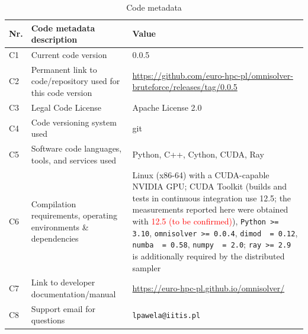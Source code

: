 \documentclass[preprint,12pt,a4paper]{elsarticle}
\newcommand{\cudameas}{\textcolor{red}{12.5 (to be confirmed)}}
\begin{document}
\begin{table}[H]
\setlength{\tabcolsep}{4pt}
\begin{tabular}{|l|p{5.6cm}|p{6.4cm}|}
\hline
\textbf{Nr.} & \textbf{Code metadata description} & \textbf{Value} \\
\hline
C1 & Current code version & 0.0.5 \\
\hline
C2 & Permanent link to code/repository used for this code version &
\url{https://github.com/euro-hpc-pl/omnisolver-bruteforce/releases/tag/0.0.5} \\
\hline
C3 & Legal Code License & Apache License 2.0 \\
\hline
C4 & Code versioning system used & git \\
\hline
C5 & Software code languages, tools, and services used & Python, C++, Cython,
CUDA, Ray \\
\hline
C6 & Compilation requirements, operating environments \& dependencies & Linux
(x86-64) with a CUDA-capable NVIDIA GPU; CUDA Toolkit (builds and tests in
continuous integration use 12.5; the measurements reported here were obtained
with \cudameas), \texttt{Python >= 3.10}, \texttt{omnisolver >= 0.0.4},
\texttt{dimod ~= 0.12}, \texttt{numba ~= 0.58}, \texttt{numpy ~= 2.0};
\texttt{ray >= 2.9} is additionally required by the distributed sampler \\
\hline
C7 & Link to developer documentation/manual &
\url{https://euro-hpc-pl.github.io/omnisolver/} \\
\hline
C8 & Support email for questions & \verb|lpawela@iitis.pl| \\
\hline
\end{tabular}
\caption{Code metadata}
\label{codeMetadata}
\end{table}
\end{document}
